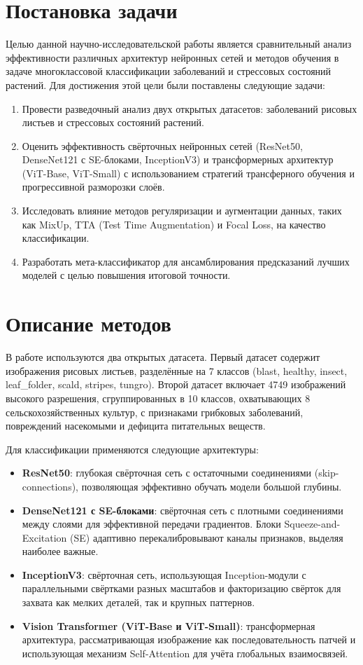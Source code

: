 \documentclass{misisarticle}
\begin{document}
\section{Постановка задачи}
Целью данной научно-исследовательской работы является сравнительный анализ эффективности различных архитектур нейронных сетей и методов обучения в задаче многоклассовой классификации заболеваний и стрессовых состояний растений. Для достижения этой цели были поставлены следующие задачи:
\begin{enumerate}
    \item Провести разведочный анализ двух открытых датасетов: заболеваний рисовых листьев и стрессовых состояний растений.
    \item Оценить эффективность свёрточных нейронных сетей (ResNet50, DenseNet121 с SE-блоками, InceptionV3) и трансформерных архитектур (ViT-Base, ViT-Small) с использованием стратегий трансферного обучения и прогрессивной разморозки слоёв.
    \item Исследовать влияние методов регуляризации и аугментации данных, таких как MixUp, TTA (Test Time Augmentation) и Focal Loss, на качество классификации.
    \item Разработать мета-классификатор для ансамблирования предсказаний лучших моделей с целью повышения итоговой точности.
\end{enumerate}

\section{Описание методов}
В работе используются два открытых датасета. Первый датасет содержит изображения рисовых листьев, разделённые на 7 классов (blast, healthy, insect, leaf\_folder, scald, stripes, tungro). Второй датасет включает 4749 изображений высокого разрешения, сгруппированных в 10 классов, охватывающих 8 сельскохозяйственных культур, с признаками грибковых заболеваний, повреждений насекомыми и дефицита питательных веществ.

Для классификации применяются следующие архитектуры:
\begin{itemize}
    \item \textbf{ResNet50}: глубокая свёрточная сеть с остаточными соединениями (skip-connections), позволяющая эффективно обучать модели большой глубины.
    \item \textbf{DenseNet121 с SE-блоками}: свёрточная сеть с плотными соединениями между слоями для эффективной передачи градиентов. Блоки Squeeze-and-Excitation (SE) адаптивно перекалибровывают каналы признаков, выделяя наиболее важные.
    \item \textbf{InceptionV3}: свёрточная сеть, использующая Inception-модули с параллельными свёртками разных масштабов и факторизацию свёрток для захвата как мелких деталей, так и крупных паттернов.
    \item \textbf{Vision Transformer (ViT-Base и ViT-Small)}: трансформерная архитектура, рассматривающая изображение как последовательность патчей и использующая механизм Self-Attention для учёта глобальных взаимосвязей.
\end{itemize}
\end{document}
